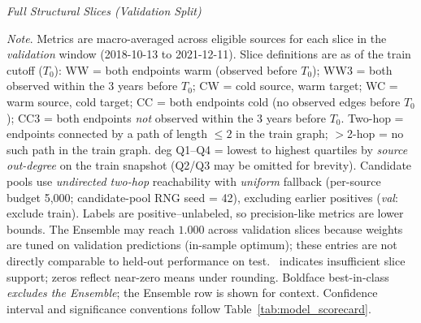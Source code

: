 \begin{landscape}
\pagestyle{landscape}
\begin{table}[p]
  \centering
  \caption[\textit{Full Structural Slices (Validation Split)}]
  {\textit{Full Structural Slices (Validation Split)}}
  \label{tab:struct_slices_val}

  \resizebox{\linewidth}{!}{}

  \captionsetup{justification=raggedright,singlelinecheck=false}
  \caption*{\footnotesize \textit{Note}. Metrics are macro-averaged across eligible sources for each slice in the \textit{validation} window (2018-10-13 to 2021-12-11).
  Slice definitions are as of the train cutoff ($T_0$):
  WW = both endpoints warm (observed before $T_0$); 
  WW3 = both observed within the 3 years before $T_0$; 
  CW = cold source, warm target; 
  WC = warm source, cold target; 
  CC = both endpoints cold (no observed edges before $T_0$); 
  CC3 = both endpoints \emph{not} observed within the 3 years before $T_0$.
  Two-hop = endpoints connected by a path of length $\leq 2$ in the train graph; 
  $>$2-hop = no such path in the train graph.
  deg Q1--Q4 = lowest to highest quartiles by \emph{source out-degree} on the train snapshot (Q2/Q3 may be omitted for brevity).
  Candidate pools use \emph{undirected two-hop} reachability with \emph{uniform} fallback (per-source budget 5{,}000; candidate-pool RNG seed = 42), excluding earlier positives (\textit{val}: exclude train).
  Labels are positive--unlabeled, so precision-like metrics are lower bounds.
  The Ensemble may reach $1.000$ across validation slices because weights are tuned on validation predictions (in-sample optimum); these entries are not directly comparable to held-out performance on test.
  \NA\ indicates insufficient slice support; zeros reflect near-zero means under rounding.
  Boldface best-in-class \emph{excludes the Ensemble}; the Ensemble row is shown for context.
  Confidence interval and significance conventions follow Table~\ref{tab:model_scorecard}.}
\end{table}
\end{landscape}
\pagestyle{fancy}

